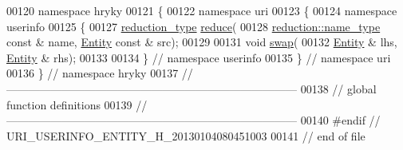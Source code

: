 \begin{DoxyCode}
00120 \textcolor{keyword}{namespace }hryky
00121 \{
00122 \textcolor{keyword}{namespace }uri
00123 \{
00124 \textcolor{keyword}{namespace }userinfo
00125 \{
00127     \hyperlink{classhryky_1_1_intrusive_ptr}{reduction_type} \hyperlink{namespacehryky_1_1uri_ab4530b241565d82fb0768bb29031858f}{reduce}(
00128         \hyperlink{classhryky_1_1reduction_1_1_string}{reduction::name_type} \textcolor{keyword}{const} & name, \hyperlink{classhryky_1_1uri_1_1userinfo_1_1_entity}{Entity} \textcolor{keyword}{const} & src);
00129 
00131     \textcolor{keywordtype}{void} \hyperlink{namespacehryky_1_1uri_a385681623309ce37d502b7efea1bf924}{swap}(
00132         \hyperlink{classhryky_1_1uri_1_1userinfo_1_1_entity}{Entity} & lhs, \hyperlink{classhryky_1_1uri_1_1userinfo_1_1_entity}{Entity} & rhs);
00133 
00134 \} \textcolor{comment}{// namespace userinfo}
00135 \} \textcolor{comment}{// namespace uri}
00136 \} \textcolor{comment}{// namespace hryky}
00137 \textcolor{comment}{//
      ------------------------------------------------------------------------------}
00138 \textcolor{comment}{// global function definitions}
00139 \textcolor{comment}{//
      ------------------------------------------------------------------------------}
00140 \textcolor{preprocessor}{#endif // URI\_USERINFO\_ENTITY\_H\_20130104080451003}
00141 \textcolor{preprocessor}{}\textcolor{comment}{// end of file}
\end{DoxyCode}
